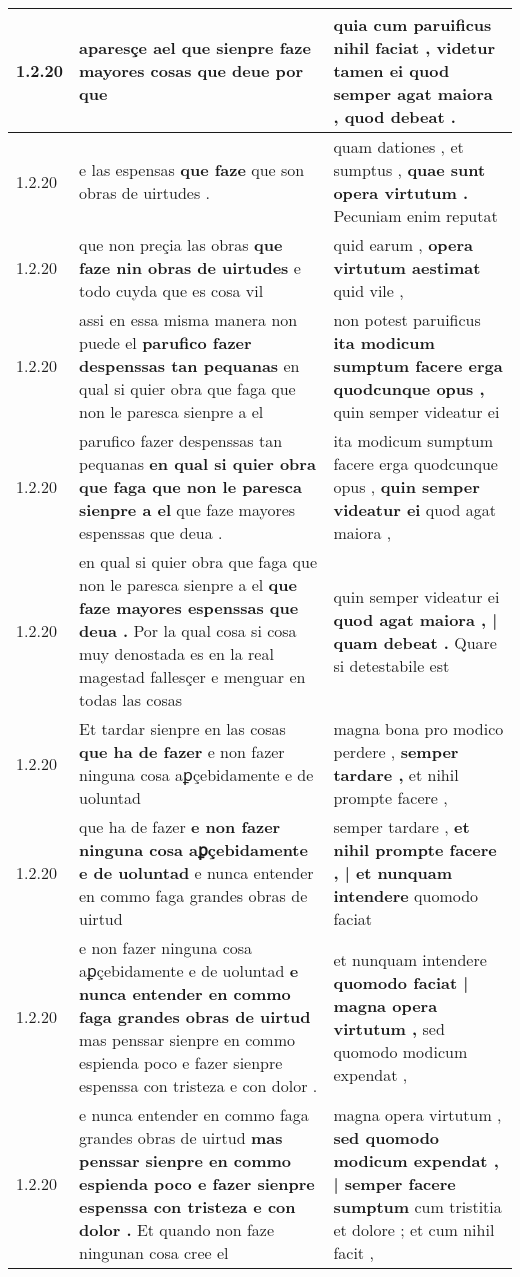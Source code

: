 \begin{tabular}{|p{1cm}|p{6.5cm}|p{6.5cm}|}
1.2.20 & aparesçe ael \textbf{ que sienpre faze mayores cosas } que deue por que & quia cum paruificus nihil faciat , \textbf{ videtur tamen ei quod semper agat maiora , } quod debeat . \\\hline
1.2.20 & e las espensas \textbf{ que faze } que son obras de uirtudes . & quam dationes , et sumptus , \textbf{ quae sunt opera virtutum . } Pecuniam enim reputat \\\hline
1.2.20 & que non preçia las obras \textbf{ que faze nin obras de uirtudes } e todo cuyda que es cosa vil & quid earum , \textbf{ opera virtutum aestimat } quid vile , \\\hline
1.2.20 & assi en essa misma manera non puede el \textbf{ parufico fazer despenssas tan pequanas } en qual si quier obra que faga que non le paresca sienpre a el & non potest paruificus \textbf{ ita modicum sumptum facere erga quodcunque opus , } quin semper videatur ei \\\hline
1.2.20 & parufico fazer despenssas tan pequanas \textbf{ en qual si quier obra que faga que non le paresca sienpre a el } que faze mayores espenssas que deua . & ita modicum sumptum facere erga quodcunque opus , \textbf{ quin semper videatur ei } quod agat maiora , \\\hline
1.2.20 & en qual si quier obra que faga que non le paresca sienpre a el \textbf{ que faze mayores espenssas que deua . } Por la qual cosa si cosa muy denostada es en la real magestad fallesçer e menguar en todas las cosas & quin semper videatur ei \textbf{ quod agat maiora , | quam debeat . } Quare si detestabile est \\\hline
1.2.20 & Et tardar sienpre en las cosas \textbf{ que ha de fazer } e non fazer ninguna cosa aꝑçebidamente e de uoluntad & magna bona pro modico perdere , \textbf{ semper tardare , } et nihil prompte facere , \\\hline
1.2.20 & que ha de fazer \textbf{ e non fazer ninguna cosa aꝑçebidamente e de uoluntad } e nunca entender en commo faga grandes obras de uirtud & semper tardare , \textbf{ et nihil prompte facere , | et nunquam intendere } quomodo faciat \\\hline
1.2.20 & e non fazer ninguna cosa aꝑçebidamente e de uoluntad \textbf{ e nunca entender en commo faga grandes obras de uirtud } mas penssar sienpre en commo espienda poco e fazer sienpre espenssa con tristeza e con dolor . & et nunquam intendere \textbf{ quomodo faciat | magna opera virtutum , } sed quomodo modicum expendat , \\\hline
1.2.20 & e nunca entender en commo faga grandes obras de uirtud \textbf{ mas penssar sienpre en commo espienda poco e fazer sienpre espenssa con tristeza e con dolor . } Et quando non faze ningunan cosa cree el & magna opera virtutum , \textbf{ sed quomodo modicum expendat , | semper facere sumptum } cum tristitia et dolore ; et cum nihil facit , \\\hline

\end{tabular}
